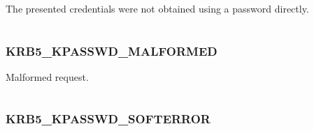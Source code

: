 \documentclass[letterpaper,10pt,english]{sphinxmanual}
\begin{document}
\begin{fulllineitems}
\label{appdev/refs/macros/KRB5_KPASSWD_INITIAL_FLAG_NEEDED:KRB5_KPASSWD_INITIAL_FLAG_NEEDED}
\end{fulllineitems}


The presented credentials were not obtained using a password directly.

\begin{tabulary}{\linewidth}{|L|L|}
\hline

 & 
\\\hline
\end{tabulary}



\subsubsection{KRB5\_KPASSWD\_MALFORMED}
\label{appdev/refs/macros/KRB5_KPASSWD_MALFORMED:krb5-kpasswd-malformed-data}\label{appdev/refs/macros/KRB5_KPASSWD_MALFORMED:krb5-kpasswd-malformed}\label{appdev/refs/macros/KRB5_KPASSWD_MALFORMED::doc}

\begin{fulllineitems}
\label{appdev/refs/macros/KRB5_KPASSWD_MALFORMED:KRB5_KPASSWD_MALFORMED}
\end{fulllineitems}


Malformed request.

\begin{tabulary}{\linewidth}{|L|L|}
\hline

 & 
\\\hline
\end{tabulary}



\subsubsection{KRB5\_KPASSWD\_SOFTERROR}
\label{appdev/refs/macros/KRB5_KPASSWD_SOFTERROR::doc}\label{appdev/refs/macros/KRB5_KPASSWD_SOFTERROR:krb5-kpasswd-softerror}\label{appdev/refs/macros/KRB5_KPASSWD_SOFTERROR:krb5-kpasswd-softerror-data}

\begin{fulllineitems}
\label{appdev/refs/macros/KRB5_KPASSWD_SOFTERROR:KRB5_KPASSWD_SOFTERROR}
\end{fulllineitems}
\end{document}
